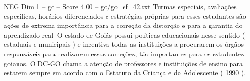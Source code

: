 \begin{textsample}{NEG Dim 1 – go – Score 4.00 – go/go\_ef\_42.txt}
Turmas especiais, avaliações específicas, horários diferenciados e estratégias próprias para esses estudantes são ações de extrema importância para a correção da distorção e para a garantia do aprendizado real.
O estado de Goiás possui políticas educacionais nesse sentido ( estaduais e municipais ) e incentiva todas as instituições a procurarem os órgãos responsáveis para realizarem essas correções, tão importantes para os estudantes goianos.
O DC-GO chama a atenção de professores e instituições de ensino para estarem sempre em acordo com o Estatuto da Criança e do Adolescente ( 1990 ).

\end{textsample}

